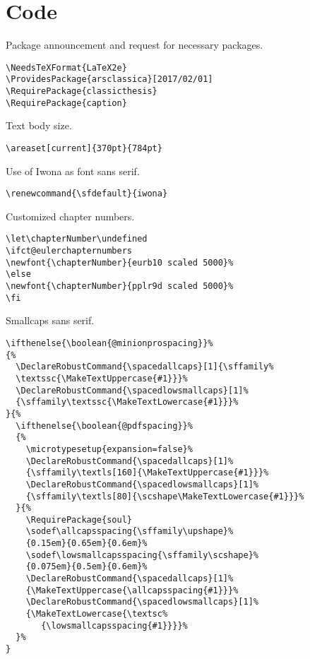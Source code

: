 
\chapter{Code}
\label{chp:code}
 
\lstset{numbers=left,
    numberstyle=\scriptsize,
    stepnumber=1,
    numbersep=8pt
}    



Package announcement and request for necessary packages.
\begin{lstlisting}[firstnumber=1]
\NeedsTeXFormat{LaTeX2e}
\ProvidesPackage{arsclassica}[2017/02/01]
\RequirePackage{classicthesis}
\RequirePackage{caption}
\end{lstlisting}



Text body size.
\begin{lstlisting}
\areaset[current]{370pt}{784pt}
\end{lstlisting}



Use of Iwona as font sans serif.
\begin{lstlisting}
\renewcommand{\sfdefault}{iwona}
\end{lstlisting}



Customized chapter numbers.
\begin{lstlisting}
\let\chapterNumber\undefined
\ifct@eulerchapternumbers
\newfont{\chapterNumber}{eurb10 scaled 5000}%
\else
\newfont{\chapterNumber}{pplr9d scaled 5000}%
\fi
\end{lstlisting}



Smallcaps sans serif.
\begin{lstlisting}
\ifthenelse{\boolean{@minionprospacing}}%
{%
  \DeclareRobustCommand{\spacedallcaps}[1]{\sffamily%
  \textssc{\MakeTextUppercase{#1}}}%
  \DeclareRobustCommand{\spacedlowsmallcaps}[1]%
  {\sffamily\textssc{\MakeTextLowercase{#1}}}%
}{%
  \ifthenelse{\boolean{@pdfspacing}}%
  {%
    \microtypesetup{expansion=false}%
    \DeclareRobustCommand{\spacedallcaps}[1]%
    {\sffamily\textls[160]{\MakeTextUppercase{#1}}}%
    \DeclareRobustCommand{\spacedlowsmallcaps}[1]%
    {\sffamily\textls[80]{\scshape\MakeTextLowercase{#1}}}%
  }{%
    \RequirePackage{soul} 
    \sodef\allcapsspacing{\sffamily\upshape}%
    {0.15em}{0.65em}{0.6em}%
    \sodef\lowsmallcapsspacing{\sffamily\scshape}%
    {0.075em}{0.5em}{0.6em}%   
    \DeclareRobustCommand{\spacedallcaps}[1]%
    {\MakeTextUppercase{\allcapsspacing{#1}}}%   
	\DeclareRobustCommand{\spacedlowsmallcaps}[1]%
	{\MakeTextLowercase{\textsc%
	   {\lowsmallcapsspacing{#1}}}}%
  }%
}
\end{lstlisting}



